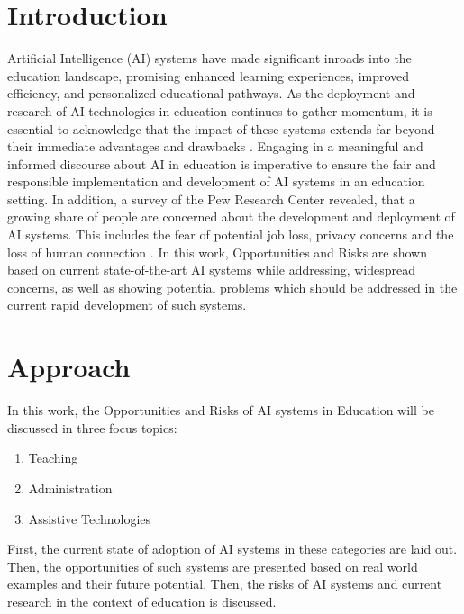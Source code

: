 \documentclass{Academic}
\begin{document}
    \myabstract{}
    \renewcommand{\myTitle}{A Survey of Opportunities and Risks of AI Systems in Education}
    \renewcommand{\MyAuthor}{Leon Knorr}
    \renewcommand{\MyDepartment}{Mannheim Master of Datascience}
    \renewcommand{\ID}{1902854}
    \renewcommand{\Keywords}{Education, AI}
    \maketitle


    \section{Introduction}
    Artificial Intelligence (AI) systems have made significant inroads into the education landscape, promising enhanced learning experiences, improved efficiency, and personalized educational pathways. As the deployment and research of AI technologies in education continues to gather momentum, it is essential to acknowledge that the impact of these systems extends far beyond their immediate advantages and drawbacks \cite{chen_ai_2023}. Engaging in a meaningful and informed discourse about AI in education is imperative to ensure the fair and responsible implementation and development of AI systems in an education setting. In addition, a survey of the Pew Research Center revealed, that a growing share of people are concerned about the development and deployment of AI systems. This includes the fear of potential job loss, privacy concerns and the loss of human connection \cite{nadeem_1_2022}. In this work, Opportunities and Risks are shown based on current state-of-the-art AI systems while addressing, widespread concerns, as well as showing potential problems which should be addressed in the current rapid development of such systems.
    
    \section{Approach}
    In this work, the Opportunities and Risks of AI systems in Education will be discussed in three focus topics:
    \begin{enumerate}
        \item Teaching
        \item Administration
        \item Assistive Technologies
    \end{enumerate}
    First, the current state of adoption of AI systems in these categories are laid out. Then, the opportunities of such systems are presented based on real world examples and their future potential. Then, the risks of AI systems and current research in the context of education is discussed.
    
\end{document}

